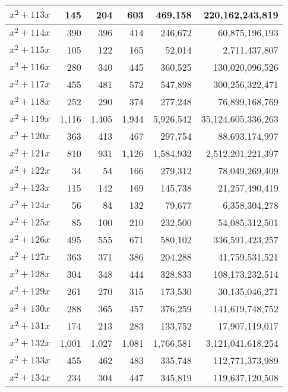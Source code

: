\documentclass[a4paper]{amsproc}
\theoremstyle{plain}
\theoremstyle{named}
\begin{document}
\begin{longtable}{ | l | r | r | r | r | r | }
$x^2 + 113x$ & 145 & 204 & 603 & 469{,}158 & 220{,}162{,}243{,}819 \\ \hline
$x^2 + 114x$ & 390 & 396 & 414 & 246{,}672 & 60{,}875{,}196{,}193 \\ \hline
$x^2 + 115x$ & 105 & 122 & 165 & 52{,}014 & 2{,}711{,}437{,}807 \\ \hline
$x^2 + 116x$ & 280 & 340 & 445 & 360{,}525 & 130{,}020{,}096{,}526 \\ \hline
$x^2 + 117x$ & 455 & 481 & 572 & 547{,}898 & 300{,}256{,}322{,}471 \\ \hline
$x^2 + 118x$ & 252 & 290 & 374 & 277{,}248 & 76{,}899{,}168{,}769 \\ \hline
$x^2 + 119x$ & 1{,}116 & 1{,}405 & 1{,}944 & 5{,}926{,}542 & 35{,}124{,}605{,}336{,}263 \\ \hline
$x^2 + 120x$ & 363 & 413 & 467 & 297{,}754 & 88{,}693{,}174{,}997 \\ \hline
$x^2 + 121x$ & 810 & 931 & 1{,}126 & 1{,}584{,}932 & 2{,}512{,}201{,}221{,}397 \\ \hline
$x^2 + 122x$ & 34 & 54 & 166 & 279{,}312 & 78{,}049{,}269{,}409 \\ \hline
$x^2 + 123x$ & 115 & 142 & 169 & 145{,}738 & 21{,}257{,}490{,}419 \\ \hline
$x^2 + 124x$ & 56 & 84 & 132 & 79{,}677 & 6{,}358{,}304{,}278 \\ \hline
$x^2 + 125x$ & 85 & 100 & 210 & 232{,}500 & 54{,}085{,}312{,}501 \\ \hline
$x^2 + 126x$ & 495 & 555 & 671 & 580{,}102 & 336{,}591{,}423{,}257 \\ \hline
$x^2 + 127x$ & 363 & 371 & 386 & 204{,}288 & 41{,}759{,}531{,}521 \\ \hline
$x^2 + 128x$ & 304 & 348 & 444 & 328{,}833 & 108{,}173{,}232{,}514 \\ \hline
$x^2 + 129x$ & 261 & 270 & 315 & 173{,}530 & 30{,}135{,}046{,}271 \\ \hline
$x^2 + 130x$ & 288 & 365 & 457 & 376{,}259 & 141{,}619{,}748{,}752 \\ \hline
$x^2 + 131x$ & 174 & 213 & 283 & 133{,}752 & 17{,}907{,}119{,}017 \\ \hline
$x^2 + 132x$ & 1{,}001 & 1{,}027 & 1{,}081 & 1{,}766{,}581 & 3{,}121{,}041{,}618{,}254 \\ \hline
$x^2 + 133x$ & 455 & 462 & 483 & 335{,}748 & 112{,}771{,}373{,}989 \\ \hline
$x^2 + 134x$ & 234 & 304 & 447 & 345{,}819 & 119{,}637{,}120{,}508 \\ \hline

\end{longtable}
\end{document}
